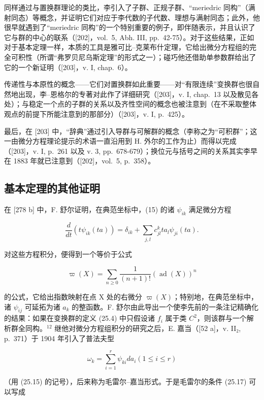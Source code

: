 同样通过与置换群理论的类比，李引入了子群、正规子群、“meriedric 同构”（满射同态）等概念，并证明它们对应于李代数的子代数、理想与满射同态；此外，他很早就遇到了“meriedric 同构”的一个特别重要的例子，即伴随表示，并且认识了它与群的中心的联系（{[}202{]}，vol.~5, Abh. III, pp.~42-75）。对于这些结果，正如对于基本定理一样，本质的工具是雅可比–克莱布什定理，它给出微分方程组的完全可积性（所谓“弗罗贝尼乌斯定理”的形式之一）；碰巧他还借助单参数群给出了它的一个新证明（{[}203{]}，v. I, chap.~6）。

传递性与本原性的概念——它们对置换群如此重要——对“有限连续”变换群也很自然地出现，李–恩格尔的专著对此作了详细研究（{[}203{]}，v. I, chap.~13 以及散见各处）；与稳定一个点的子群的关系以及齐性空间的概念也被注意到（在不采取整体观点的前提下所能注意到的那部分）（{[}203{]}，v. I, p.~425）。

最后，在 {[}203{]} 中，“辞典”通过引入导群与可解群的概念（李称之为“可积群”；这一由微分方程理论提示的术语一直沿用到 H. 外尔的工作为止）而得以完成（{[}203{]}，v. I, p.~261 以及 v. 3, pp.~678-679）；换位元与括号之间的关系其实李早在 1883 年就已注意到（{[}202{]}，vol.~5, p.~358）。

\subsection*{基本定理的其他证明}
{}

在 {[}278 b{]} 中，F. 舒尔证明，在典范坐标中，(15) 的诸 \(\psi_{ik}\) 满足微分方程

\[
\frac {d}{d t} (t \psi_ {i k} (t a)) = \delta_ {i k} + \sum_ {j, l} c _ {j l} ^ {k} t a _ {l} \psi_ {j i} (t a).\tag{25.23}
\]

对这些方程积分，便得到一个等价于公式

\[
\varpi (X) = \sum_ {n \geq 0} \frac {1}{(n + 1) !} (\operatorname{ad} (X)) ^ {n}\tag{25.24}
\]

的公式，它给出指数映射在点 X 处的右微分 \(\varpi(X)\)；特别地，在典范坐标中，诸 \(\psi_{ij}\) 可延拓为诸 \(a_{k}\) 的整函数。F. 舒尔由此导出一个使李先前的一条注记精确化的结果：如果在变换群的定义 (25.4) 中只假设诸 \(f_{i}\) 属于类 \(C^{2}\)，则该群与一个解析群全同构。\(^{12}\) 继他对微分方程组积分的研究之后，E. 嘉当（{[}52 a{]}，v. II₂, p.~371）于 1904 年引入了普法夫型

\[
\omega_ {k} = \sum_ {i = 1} ^ {r} \psi_ {k i} d a _ {i} (1 \leq i \leq r)\tag{25.25}
\]

（用 (25.15) 的记号），后来称为毛雷尔–嘉当形式。于是毛雷尔的条件 (25.17) 可以写成

